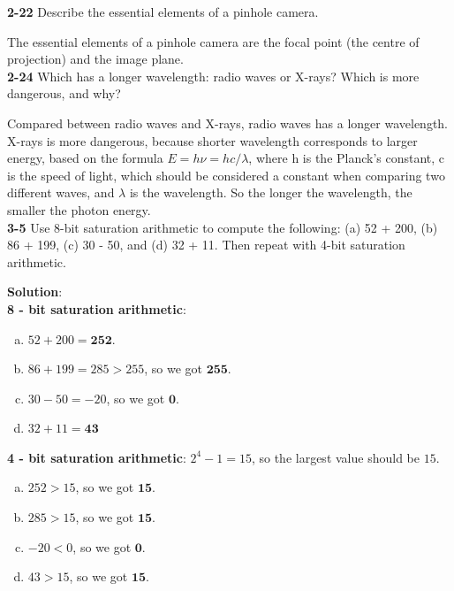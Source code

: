 \documentclass[a4paper]{article}
\begin{document}
\begin{spacing}{2.0}
	\noindent
	\textbf{2-22} Describe the essential elements of a pinhole camera.
	
	The essential elements of a pinhole camera are the focal point (the centre of projection) and the image plane.\\
	
	\noindent
	\textbf{2-24} Which has a longer wavelength: radio waves or X-rays? Which is more dangerous, and why?
	
	Compared between radio waves and X-rays, radio waves has a longer wavelength. X-rays is more dangerous, because shorter wavelength corresponds to larger energy, based on the formula $E = h\nu = hc/\lambda$, where h is the Planck's constant, c is the speed of light, which should be considered a constant when comparing two different waves, and $\lambda$ is the wavelength. So the longer the wavelength, the smaller the photon energy. \\
	
	\noindent
	\textbf{3-5} Use 8-bit saturation arithmetic to compute the following: (a) 52 + 200, (b) 86 + 199, (c) 30 - 50, and (d) 32 + 11. Then repeat with 4-bit saturation arithmetic.
	
	\textbf{Solution}:\\
	\textbf{8 - bit saturation arithmetic}: 
		\begin{enumerate}[(a)] 
			\item $52+200 = \mathbf{252}$.
			\item $86+199 = 285>255$, so we got  $\mathbf{255}$.
			\item $30-50 = -20$, so we got  $\mathbf{0}$.
			\item $32+11 =  \mathbf{43}$
		\end{enumerate}
	\textbf{4 - bit saturation arithmetic}: 
		$2^4-1 = 15$, so the largest value should be $15$.
		\begin{enumerate}[(a)] 
			\item $252>15$, so we got  $\mathbf{15}$.
			\item $285>15$, so we got  $\mathbf{15}$.
			\item $-20<0$, so we got  $\mathbf{0}$.
			\item $43>15$, so we got  $\mathbf{15}$.\\
		\end{enumerate}
	

\end{spacing}
\end{document}
